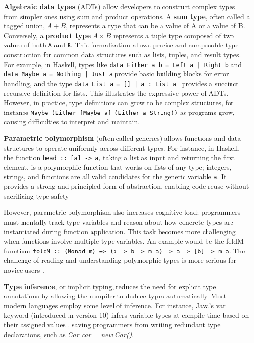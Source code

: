 \documentclass[preprint,12pt]{elsarticle}
\begin{document}
{\bf Algebraic data types} (ADTs) \cite{Milner1978-qz} allow developers to construct complex types from simpler ones using sum and product operations. A {\bf sum type}, often called a tagged union, $A + B$, represents a type that can be a value of A or a value of B. Conversely, a {\bf product type} $A \times B$ represents a tuple type composed of two values of both {\tt A} and {\tt B}. This formalization allows precise and composable type construction for common data structures such as lists, tuples, and result types.
For example, in Haskell, types like \texttt{data Either a b = Left a | Right b} and \texttt{data Maybe a = Nothing | Just a} provide basic building blocks for error handling, and the type \texttt{data List a = [] | a : List a } provides a succinct recursive definition for lists. This illustrates the expressive power of ADTs. However, in practice, type definitions can grow to be complex structures, for instance \texttt {Maybe (Either [Maybe a] (Either a String))} as programs grow, causing difficulties to interpret and maintain. 


{\bf Parametric polymorphism} (often called generics) allows functions and data structures to operate uniformly across different types. For instance, in Haskell, the function \texttt{head :: [a] -> a}, taking a list as input and returning the first element, is a polymorphic function that works on lists of any type; integers, strings, and functions are all valid candidates for the generic variable \texttt{a}.  It provides a strong and principled form of abstraction, enabling code reuse without sacrificing type safety.

However, parametric polymorphism also increases cognitive load: programmers must mentally track type variables and reason about how concrete types are instantiated during function application. This task becomes more challenging when functions involve multiple type variables. An example would be the foldM function: \texttt{foldM :: (Monad m) => (a -> b -> m a) -> a -> [b] -> m a}. The challenge of reading and understanding polymorphic types is more serious for novice users \cite{Jun2000-ec, Jun2000-yu}.



{\bf Type inference}, or implicit typing, reduces the need for explicit type annotations by allowing the compiler to deduce types automatically.
Most modern languages employ some level of inference. For instance, Java’s var keyword (introduced in version 10) infers variable types at compile time based on their assigned values \cite{Java_Developers2023-an}, saving programmers from writing redundant type declarations, such as \textit {Car car = new Car()}.
\end{document}

